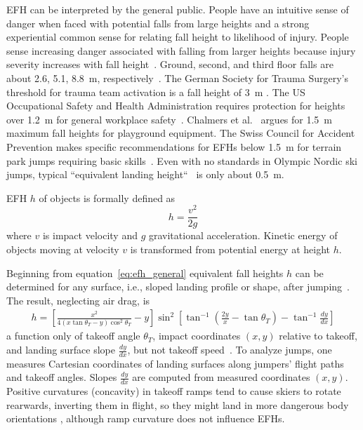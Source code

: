\documentclass{article}
\begin{document}
EFH can be interpreted by the general public. People have an intuitive sense of
danger when faced with potential falls from large heights and a strong
experiential common sense for relating fall height to likelihood of injury.
People sense increasing danger associated with falling from larger heights
because injury severity increases with fall height~\cite{Nau2021}.  Ground,
second, and third floor falls are about 2.6, 5.1, 8.8~\si{\meter},
respectively~\cite{Vish2005}. The German Society for Trauma Surgery's threshold
for trauma team activation is a fall height of 3~\si{\meter}
\cite{PolytraumaGuidelineUpdateGroup2018}. The US Occupational Safety and
Health Administration requires protection for heights over 1.2~\si{\meter} for
general workplace safety~\cite{OSHA2021}.  Chalmers et al.~\cite{Chalmers1996}
argues for 1.5~\si{\meter} maximum fall heights for playground equipment. The
Swiss Council for Accident Prevention makes specific recommendations for EFHs
below 1.5~\si{\meter} for terrain park jumps requiring basic
skills~\cite{Heer2019}.  Even with no standards in Olympic Nordic ski jumps,
typical ``equivalent landing height``~\cite{Gasser2018} is only about
0.5~\si{\meter}.

EFH $h$ of objects is formally defined as
%
\begin{equation}
  h = \frac{v^2}{2g}
  \label{eq:efh_general}
\end{equation}
%
where $v$ is impact velocity and $g$ gravitational acceleration.  Kinetic
energy of objects moving at  velocity $v$  is transformed from potential energy
at height $h$.

Beginning from equation~\ref{eq:efh_general} equivalent fall heights $h$ can be
determined for any surface, i.e., sloped landing profile or shape, after
jumping~\cite{Petrone2017}. The result, neglecting air drag, is
%
\begin{align}
  h = \left[\frac{x^2}{4(x\tan\theta_T - y)\cos^{2}\theta_T} - y\right]
    \sin^{2}
    \left[\tan^{-1}\left(\frac{2y}{x} - \tan\theta_T\right) -
    \tan^{-1}\frac{dy}{dx}\right]
  \label{eq:efh}
\end{align}
%
a function only of takeoff angle $\theta_T$, impact coordinates $(x,y)$
relative to takeoff, and landing surface slope $\frac{dy}{dx}$, but not takeoff
speed~\cite{Petrone2017}. To analyze jumps, one measures Cartesian coordinates
of landing surfaces along jumpers' flight paths and takeoff angles. Slopes
$\frac{dy}{dx}$ are computed from measured coordinates $(x,y)$. Positive
curvatures (concavity) in takeoff ramps tend to cause skiers to rotate
rearwards, inverting them in flight, so they might land in more dangerous body
orientations \cite{Scher2015}, although ramp curvature does not influence EFHs.
\end{document}
